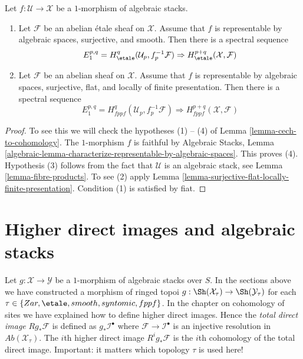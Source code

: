 \begin{proposition}
\label{proposition-smooth-covering-compute-cohomology}
Let $f : \mathcal{U} \to \mathcal{X}$ be a $1$-morphism of algebraic stacks.
\begin{enumerate}
\item Let $\mathcal{F}$ be an abelian \'etale sheaf on $\mathcal{X}$.
Assume that $f$ is representable by algebraic spaces, surjective, and smooth.
Then there is a spectral sequence
$$
E_1^{p, q} = H^q_\etale(\mathcal{U}_p, f_p^{-1}\mathcal{F})
\Rightarrow
H^{p + q}_\etale(\mathcal{X}, \mathcal{F})
$$
\item Let $\mathcal{F}$ be an abelian sheaf on $\mathcal{X}$.
Assume that $f$ is representable by algebraic spaces, surjective, flat,
and locally of finite presentation. Then there is
a spectral sequence
$$
E_1^{p, q} = H^q_{fppf}(\mathcal{U}_p, f_p^{-1}\mathcal{F})
\Rightarrow
H^{p + q}_{fppf}(\mathcal{X}, \mathcal{F})
$$
\end{enumerate}
\end{proposition}

\begin{proof}
To see this we will check the hypotheses (1) -- (4) of
Lemma \ref{lemma-cech-to-cohomology}.
The $1$-morphism $f$ is faithful by
Algebraic Stacks, Lemma
\ref{algebraic-lemma-characterize-representable-by-algebraic-spaces}.
This proves (4).
Hypothesis (3) follows from the fact that $\mathcal{U}$ is an algebraic
stack, see
Lemma \ref{lemma-fibre-products}.
To see (2) apply
Lemma \ref{lemma-surjective-flat-locally-finite-presentation}.
Condition (1) is satisfied by fiat.
\end{proof}










\section{Higher direct images and algebraic stacks}
\label{section-higher-direct-images}

\noindent
Let $g : \mathcal{X} \to \mathcal{Y}$ be a $1$-morphism of algebraic stacks
over $S$. In the sections above we have constructed a morphism of ringed
topoi $g : \Sh(\mathcal{X}_\tau) \to \Sh(\mathcal{Y}_\tau)$
for each $\tau \in \{Zar, \etale, smooth, syntomic, fppf\}$.
In the chapter on cohomology of sites we have explained how to
define higher direct images. Hence the {\it total direct image}
$Rg_*\mathcal{F}$ is defined as $g_*\mathcal{I}^\bullet$ where
$\mathcal{F} \to \mathcal{I}^\bullet$ is an injective resolution in
$\textit{Ab}(\mathcal{X}_\tau)$. The $i$th higher direct image
$R^ig_*\mathcal{F}$ is the $i$th cohomology of the total direct image.
Important: it matters which topology $\tau$ is used here!

